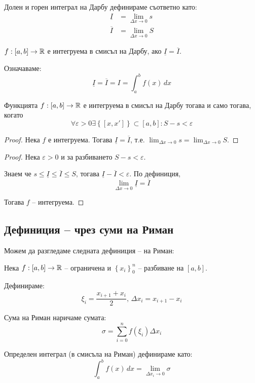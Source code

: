 \begin{definition}
    Долен и горен интеграл на Дарбу дефинираме съответно като:
    \begin{align*}
        \underline{I} & = \lim_{\Delta{x} \to 0} s \\
        \overline{I}  & = \lim_{\Delta{x} \to 0} S
    \end{align*}

\end{definition}

\begin{definition}
    $f: [a,b] \to \mathbb{R}$ е интегруема в смисъл на Дарбу, ако $\underline{I} = \overline{I}$.

    Означаваме:
    \[\underline{I} = \overline{I} = I = \int_{a}^b f(x)\,dx\]
\end{definition}

\begin{theorem}
    Функцията $f: [a,b] \to \mathbb{R}$ е интегруема в смисъл на Дарбу тогава и само тогава, когато
    \[\forall \varepsilon > 0 \exists\left\{[x,x']\right\} \subset [a,b] : S-s < \varepsilon\]

    \begin{proof}
        Нека $f$ е интегруема. Тогава $\underline{I} = \overline{I}$, т.е. $\lim_{\Delta{x} \to 0} s =  \lim_{\Delta{x} \to 0} S$.
    \end{proof}
    \begin{proof}
        Нека $\varepsilon > 0$ и за разбиването $S-s<\varepsilon$.

        Знаем че $s \leq \underline{I} \leq \overline{I} \leq S$, тогава $\underline{I} - \overline{I} < \varepsilon$.
        По дефиниция,
        \[\lim_{\Delta x \to 0} \underline{I} = \overline{I}\]

        Тогава $f$ -- интегруема.
    \end{proof}
\end{theorem}

\subsection{Дефиниция -- чрез суми на Риман}
Можем да разгледаме следната дефиниция -- на Риман:

\begin{definition}
    Нека $f: [a,b] \to \mathbb{R}$ -- ограничена и $\left\{x_i\right\}_0^{n}$ -- разбиване на $[a,b]$.

    Дефинираме:
    \[\xi_i = \frac{x_{i+1}+x_i}{2},\,\Delta{x_i} = x_{i+1}-x_i\]

    Сума на Риман наричаме сумата:
    \[\sigma = \sum_{i=0}^n f(\xi_i)\Delta{x_i}\]

    Определен интеграл (в смисъла на Риман) дефинираме като:
    \[\int_a^b f(x)\,dx = \lim_{\Delta x_i \to 0} \sigma\]
\end{definition}

